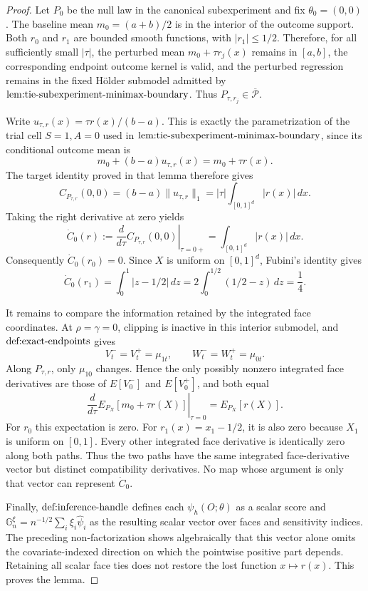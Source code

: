 \documentclass{article}
\begin{document}
\begin{proof}
Let \(P_0\) be the null law in the canonical subexperiment and fix \(\theta_0=(0,0)\). The baseline mean \(m_0=(a+b)/2\) is in the interior of the outcome support. Both \(r_0\) and \(r_1\) are bounded smooth functions, with \(|r_1|\le 1/2\). Therefore, for all sufficiently small \(|\tau|\), the perturbed mean \(m_0+\tau r_j(x)\) remains in \([a,b]\), the corresponding endpoint outcome kernel is valid, and the perturbed regression remains in the fixed Hölder submodel admitted by \(\textup{lem:tie-subexperiment-minimax-boundary}\). Thus \(P_{\tau,r_j}\in\overline{\mathcal P}\).

Write \(u_{\tau,r}(x)=\tau r(x)/(b-a)\). This is exactly the parametrization of the trial cell \(S=1,A=0\) used in \(\textup{lem:tie-subexperiment-minimax-boundary}\), since its conditional outcome mean is
\[m_0+(b-a)u_{\tau,r}(x)=m_0+\tau r(x).\]
The target identity proved in that lemma therefore gives
\[C_{P_{\tau,r}}(0,0)=(b-a)\lVert u_{\tau,r}\rVert_1=|\tau|\int_{[0,1]^d}|r(x)|\,dx.\]
Taking the right derivative at zero yields
\[\dot C_0(r):=\left.\frac{d}{d\tau}C_{P_{\tau,r}}(0,0)\right|_{\tau=0+}=\int_{[0,1]^d}|r(x)|\,dx.\]
Consequently \(\dot C_0(r_0)=0\). Since \(X\) is uniform on \([0,1]^d\), Fubini's identity gives
\[\dot C_0(r_1)=\int_0^1|z-1/2|\,dz=2\int_0^{1/2}(1/2-z)\,dz=\frac14.\]

It remains to compare the information retained by the integrated face coordinates. At \(\rho=\gamma=0\), clipping is inactive in this interior submodel, and \(\textup{def:exact-endpoints}\) gives
\[V_t^-=V_t^+=\mu_{1t},\qquad W_t^-=W_t^+=\mu_{0t}.\]
Along \(P_{\tau,r}\), only \(\mu_{10}\) changes. Hence the only possibly nonzero integrated face derivatives are those of \(E[V_0^-]\) and \(E[V_0^+]\), and both equal
\[\left.\frac{d}{d\tau}E_{P_X}[m_0+\tau r(X)]\right|_{\tau=0}=E_{P_X}[r(X)].\]
For \(r_0\) this expectation is zero. For \(r_1(x)=x_1-1/2\), it is also zero because \(X_1\) is uniform on \([0,1]\). Every other integrated face derivative is identically zero along both paths. Thus the two paths have the same integrated face-derivative vector but distinct compatibility derivatives. No map whose argument is only that vector can represent \(\dot C_0\).

Finally, \(\textup{def:inference-handle}\) defines each \(\psi_h(O;\theta)\) as a scalar score and \(\mathbb G_n^\xi=n^{-1/2}\sum_i\xi_i\widehat\psi_i\) as the resulting scalar vector over faces and sensitivity indices. The preceding non-factorization shows algebraically that this vector alone omits the covariate-indexed direction on which the pointwise positive part depends. Retaining all scalar face ties does not restore the lost function \(x\mapsto r(x)\). This proves the lemma.
\end{proof}
\end{document}

